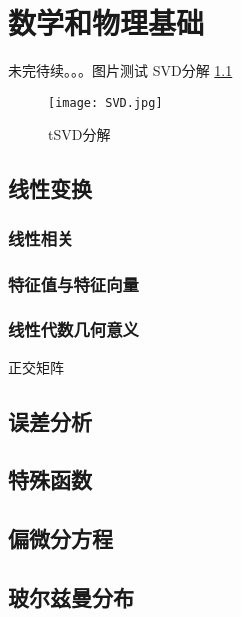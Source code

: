\chapter{数学和物理基础}
未完待续。。。图片测试
SVD分解 \ref{1}
\begin{figure}[htbp]
	\centering
	\texttt{[image: SVD.jpg]}
	\caption{tSVD分解}
	\label{1}
\end{figure}
\section{线性变换}
\subsection{线性相关}
\subsection{特征值与特征向量}
\subsection{线性代数几何意义}
正交矩阵


\section{误差分析}





\section{特殊函数}



\section{偏微分方程}


\section{玻尔兹曼分布}